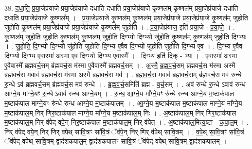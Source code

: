 \documentclass[17pt]{extarticle}
\begin{document}
38. द॒धा॒ति॒ प्र॒या॒जेप्र॑याजे प्रया॒जेप्र॑याजे दधाति दधाति प्रया॒जेप्र॑याजे कृ॒ष्णल॑म् कृ॒ष्णल॑म् प्रया॒जेप्र॑याजे दधाति दधाति प्रया॒जेप्र॑याजे कृ॒ष्णल᳚म् । . प्र॒या॒जेप्र॑याजे कृ॒ष्णल॑म् कृ॒ष्णल॑म् प्रया॒जेप्र॑याजे प्रया॒जेप्र॑याजे कृ॒ष्णल॑म् जुहोति जुहोति कृ॒ष्णल॑म् प्रया॒जेप्र॑याजे प्रया॒जेप्र॑याजे कृ॒ष्णल॑म् जुहोति । . प्र॒या॒जेप्र॑याज॒ इति॑ प्रया॒जे - प्र॒या॒जे॒ । . कृ॒ष्णल॑म् जुहोति जुहोति कृ॒ष्णल॑म् कृ॒ष्णल॑म् जुहोति दि॒ग्भ्यो दि॒ग्भ्यो जु॑होति कृ॒ष्णल॑म् कृ॒ष्णल॑म् जुहोति दि॒ग्भ्यः । . जु॒हो॒ति॒ दि॒ग्भ्यो दि॒ग्भ्यो जु॑होति जुहोति दि॒ग्भ्य ए॒वैव दि॒ग्भ्यो जु॑होति जुहोति दि॒ग्भ्य ए॒व । . दि॒ग्भ्य ए॒वैव दि॒ग्भ्यो दि॒ग्भ्य ए॒वास्मा॑ अस्मा ए॒व दि॒ग्भ्यो दि॒ग्भ्य ए॒वास्मै᳚ । . दि॒ग्भ्य इति॑ दिक् - भ्यः । . ए॒वास्मा॑ अस्मा ए॒वैवास्मै᳚ ब्रह्मवर्च॒सम् ब्र॑ह्मवर्च॒स म॑स्मा ए॒वैवास्मै᳚ ब्रह्मवर्च॒सम् । . अ॒स्मै॒ ब्र॒ह्म॒व॒र्च॒सम् ब्र॑ह्मवर्च॒स म॑स्मा अस्मै ब्रह्मवर्च॒स मवाव॑ ब्रह्मवर्च॒स म॑स्मा अस्मै ब्रह्मवर्च॒स मव॑ । . ब्र॒ह्म॒व॒र्च॒स मवाव॑ ब्रह्मवर्च॒सम् ब्र॑ह्मवर्च॒स मव॑ रुन्धे रु॒न्धे ऽव॑ ब्रह्मवर्च॒सम् ब्र॑ह्मवर्च॒स मव॑ रुन्धे । . ब्र॒ह्म॒व॒र्च॒समिति॑ ब्रह्म - व॒र्च॒सम् । . अव॑ रुन्धे रु॒न्धे ऽवाव॑ रुन्ध आग्ने॒य मा᳚ग्ने॒यꣳ रु॒न्धे ऽवाव॑ रुन्ध आग्ने॒यम् । . रु॒न्ध॒ आ॒ग्ने॒य मा᳚ग्ने॒यꣳ रु॑न्धे रुन्ध आग्ने॒य म॒ष्टाक॑पाल म॒ष्टाक॑पाल माग्ने॒यꣳ रु॑न्धे रुन्ध आग्ने॒य म॒ष्टाक॑पालम् । . आ॒ग्ने॒य म॒ष्टाक॑पाल म॒ष्टाक॑पाल माग्ने॒य मा᳚ग्ने॒य म॒ष्टाक॑पाल॒म् निर् णिर॒ष्टाक॑पाल माग्ने॒य मा᳚ग्ने॒य म॒ष्टाक॑पाल॒म् निः । . अ॒ष्टाक॑पाल॒म् निर् णिर॒ष्टाक॑पाल म॒ष्टाक॑पाल॒म् निर् व॑पेद् वपे॒न् निर॒ष्टाक॑पाल म॒ष्टाक॑पाल॒म् निर् व॑पेत् । . अ॒ष्टाक॑पाल॒मित्य॒ष्टा - क॒पा॒ल॒म् । . निर् व॑पेद् वपे॒न् निर् णिर् व॑पेथ् सावि॒त्रꣳ सा॑वि॒त्रं ॅव॑पे॒न् निर् णिर् व॑पेथ् सावि॒त्रम् । . व॒पे॒थ् सा॒वि॒त्रꣳ सा॑वि॒त्रं ॅव॑पेद् वपेथ् सावि॒त्रम् द्वाद॑शकपाल॒म् द्वाद॑शकपालꣳ सावि॒त्रं ॅव॑पेद् वपेथ् सावि॒त्रम् द्वाद॑शकपालम् । \newline
\end{document}
